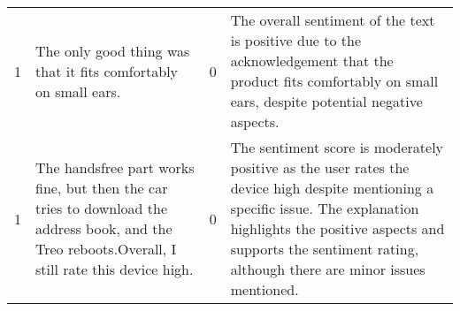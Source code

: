 \begin{tabular}{r{1cm} p{0.4in} r{1cm} p{0.4in}}
1 & The only good thing was that it fits comfortably on small ears. & 0 & The overall sentiment of the text is positive due to the acknowledgement that the product fits comfortably on small ears, despite potential negative aspects. \\
1 & The handsfree part works fine, but then the car tries to download the address book, and the Treo reboots.Overall, I still rate this device high. & 0 & The sentiment score is moderately positive as the user rates the device high despite mentioning a specific issue. The explanation highlights the positive aspects and supports the sentiment rating, although there are minor issues mentioned. \\
\bottomrule
\end{tabular}
